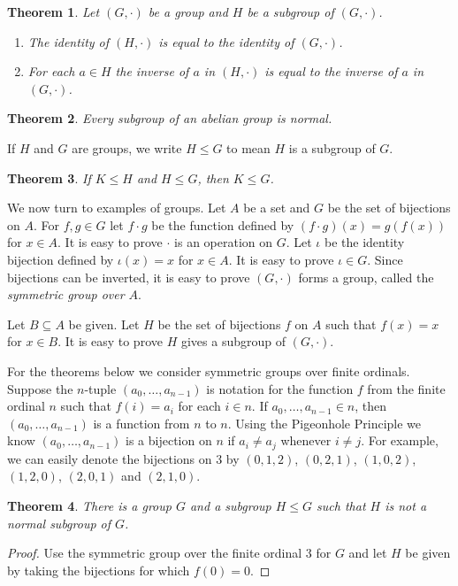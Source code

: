 \documentclass{article}
\newtheorem{theorem}{Theorem}
\begin{document}
\begin{theorem}\label{thm:subgroupidinveq}
  Let $(G,\cdot)$ be a group and $H$ be a subgroup of $(G,\cdot)$.
  \begin{enumerate}
  \item The identity of $(H,\cdot)$ is equal to the identity of $(G,\cdot)$.
  \item For each $a\in H$ the inverse of $a$ in $(H,\cdot)$ is equal to the inverse of $a$ in $(G,\cdot)$.
  \end{enumerate}
\end{theorem}

\begin{theorem}\label{thm:abeliannormal}
  Every subgroup of an abelian group is normal.
\end{theorem}

If $H$ and $G$ are groups, we write $H\leq G$ to mean $H$ is a subgroup of $G$.

\begin{theorem}\label{thm:subgrouptrans}
  If $K\leq H$ and $H\leq G$, then $K\leq G$.
\end{theorem}

We now turn to examples of groups.
Let $A$ be a set and $G$ be the set of bijections on $A$.
For $f,g\in G$ let $f\cdot g$ be the function defined by $(f\cdot g)(x) = g(f(x))$ for $x\in A$.
It is easy to prove $\cdot$ is an operation on $G$.
Let $\iota$ be the identity bijection defined by $\iota(x) = x$ for $x\in A$.
It is easy to prove $\iota\in G$.
Since bijections can be inverted, it is easy to prove $(G,\cdot)$ forms a group,
called the {\emph{symmetric group over $A$}}.

Let $B\subseteq A$ be given. Let $H$ be the set of bijections $f$ on $A$ such that $f(x)=x$ for $x\in B$.
It is easy to prove $H$ gives a subgroup of $(G,\cdot)$.

For the theorems below we consider symmetric groups over finite ordinals.
Suppose the $n$-tuple $(a_0,\ldots,a_{n-1})$ is notation for the function $f$ from the
finite ordinal $n$ such that $f(i) = a_i$ for each $i\in n$.
If $a_0,\ldots,a_{n-1}\in n$, then $(a_0,\ldots,a_{n-1})$ is a function from $n$ to $n$.
Using the Pigeonhole Principle we know $(a_0,\ldots,a_{n-1})$ is a bijection on $n$
if $a_i\not= a_j$ whenever $i\not=j$.
For example, we can easily denote the bijections on $3$ by $(0,1,2)$, $(0,2,1)$, $(1,0,2)$, $(1,2,0)$, $(2,0,1)$ and $(2,1,0)$.

\begin{theorem}\label{thm:nonnormal} There is a group $G$ and a subgroup $H\leq G$ such that $H$ is not a normal subgroup of $G$.
\end{theorem}
\begin{proof} Use the symmetric group over the finite ordinal $3$ for $G$ and let $H$ be
  given by taking the bijections for which $f(0) = 0$.
\end{proof}
\end{document}
